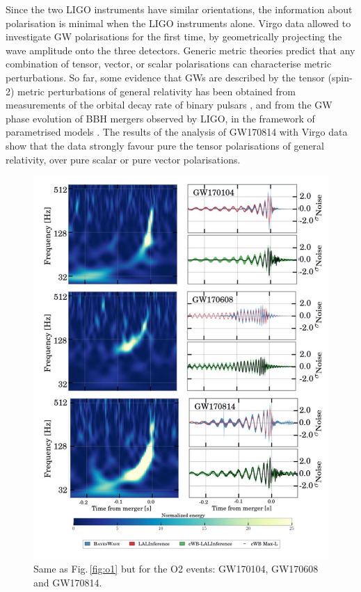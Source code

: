 \documentclass[binding=0.6cm, LaM]{sapthesis}
\begin{document}
	Since the two LIGO instruments have similar orientations, 
	the information about polarisation is minimal when the LIGO instruments alone.  
	Virgo data allowed to investigate GW polarisations for the first time, by geometrically 
	projecting the wave amplitude onto the three detectors.
	Generic metric theories predict that any combination of tensor, vector, or scalar 
	polarisations \cite{85} can characterise metric perturbations.
	So far, some evidence that GWs are described by the tensor (spin-2) metric perturbations 
	of general relativity has been obtained from measurements of the orbital decay rate of binary pulsars \cite{135,140}, 
	and from the GW phase evolution of BBH mergers observed by LIGO, in the framework of parametrised models \cite{14,52,60}. 
	The results of the analysis of GW170814 with Virgo data show that the data strongly favour
	pure the tensor polarisations of general relativity, over pure scalar or pure vector polarisations.

        \begin{figure}[!t]
          \label{o2}
          \includegraphics[scale=0.45]{o2}
          \centering
          \caption{Same as Fig.\,\ref{fig:o1} but for the O2 events: GW170104, GW170608 and GW170814.}
          \label{fig:o2}
        \end{figure}
\end{document}
